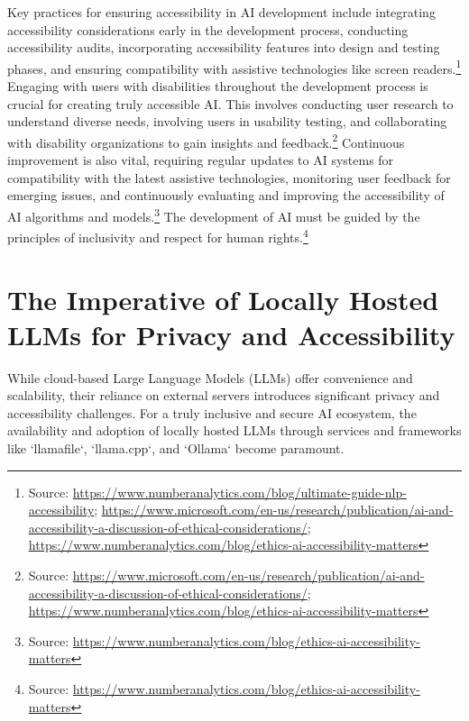 Key practices for ensuring accessibility in AI development include integrating accessibility considerations early in the development process, conducting accessibility audits, incorporating accessibility features into design and testing phases, and ensuring compatibility with assistive technologies like screen readers.\footnote{Source: \url{https://www.numberanalytics.com/blog/ultimate-guide-nlp-accessibility}; \url{https://www.microsoft.com/en-us/research/publication/ai-and-accessibility-a-discussion-of-ethical-considerations/}; \url{https://www.numberanalytics.com/blog/ethics-ai-accessibility-matters}} Engaging with users with disabilities throughout the development process is crucial for creating truly accessible AI. This involves conducting user research to understand diverse needs, involving users in usability testing, and collaborating with disability organizations to gain insights and feedback.\footnote{Source: \url{https://www.microsoft.com/en-us/research/publication/ai-and-accessibility-a-discussion-of-ethical-considerations/}; \url{https://www.numberanalytics.com/blog/ethics-ai-accessibility-matters}} Continuous improvement is also vital, requiring regular updates to AI systems for compatibility with the latest assistive technologies, monitoring user feedback for emerging issues, and continuously evaluating and improving the accessibility of AI algorithms and models.\footnote{Source: \url{https://www.numberanalytics.com/blog/ethics-ai-accessibility-matters}} The development of AI must be guided by the principles of inclusivity and respect for human rights.\footnote{Source: \url{https://www.numberanalytics.com/blog/ethics-ai-accessibility-matters}}
\section{The Imperative of Locally Hosted LLMs for Privacy and Accessibility}

While cloud-based Large Language Models (LLMs) offer convenience and scalability, their reliance on external servers introduces significant privacy and accessibility challenges. For a truly inclusive and secure AI ecosystem, the availability and adoption of locally hosted LLMs through services and frameworks like `llamafile`, `llama.cpp`, and `Ollama` become paramount.

